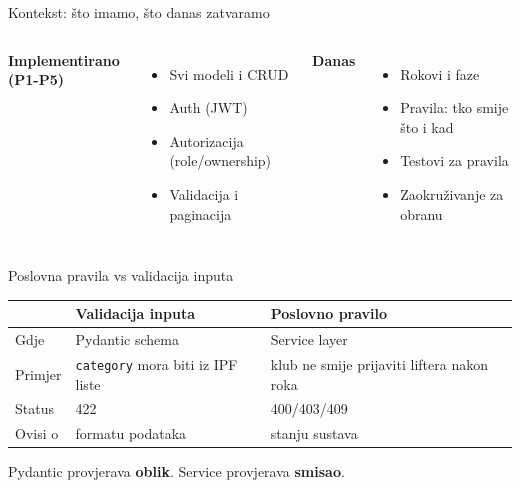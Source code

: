 \begin{frame}{Kontekst: što imamo, što danas zatvaramo}
\begin{columns}[T]
\textbf{Implementirano (P1-P5)}
\begin{itemize}
  \item Svi modeli i CRUD
  \item Auth (JWT)
  \item Autorizacija (role/ownership)
  \item Validacija i paginacija
\end{itemize}

\textbf{Danas}
\begin{itemize}
  \item Rokovi i faze
  \item Pravila: tko smije što i kad
  \item Testovi za pravila
  \item Zaokruživanje za obranu
\end{itemize}
\end{columns}
\end{frame}

\begin{frame}{Poslovna pravila vs validacija inputa}
\begin{tabular}{@{}lp{5cm}p{5cm}@{}}
  \toprule
  & \textbf{Validacija inputa} & \textbf{Poslovno pravilo} \\
  \midrule
  Gdje & Pydantic schema & Service layer \\
  Primjer & \texttt{category} mora biti iz IPF liste & klub ne smije prijaviti liftera nakon roka \\
  Status & 422 & 400/403/409 \\
  Ovisi o & formatu podataka & stanju sustava \\
  \bottomrule
\end{tabular}

\vspace{0.6em}
Pydantic provjerava \textbf{oblik}. Service provjerava \textbf{smisao}.
\end{frame}

